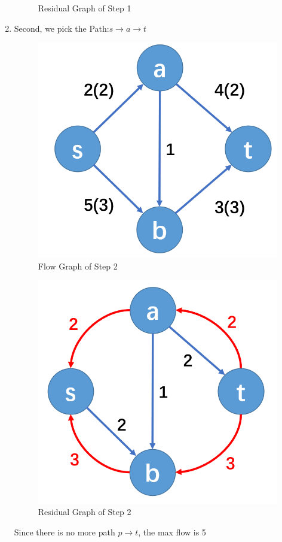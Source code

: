 \documentclass[a4paper]{article}
\begin{document}
\begin{enumerate}
\begin{figure}[H]
        \caption{Residual Graph of Step 1}
    \end{figure}
    \item Second, we pick the Path:$s\rightarrow a\rightarrow t$
    \begin{figure}[H]
        \centering
        \includegraphics[scale=0.25]{P4.png}
        \caption{Flow Graph of Step 2}
    \end{figure}
    \begin{figure}[H]
        \centering
        \includegraphics[scale=0.25]{P5.png}
        \caption{Residual Graph of Step 2}
    \end{figure}
    Since there is no more path $p\rightarrow t$, the max flow is 5
\end{enumerate}
\end{document}
